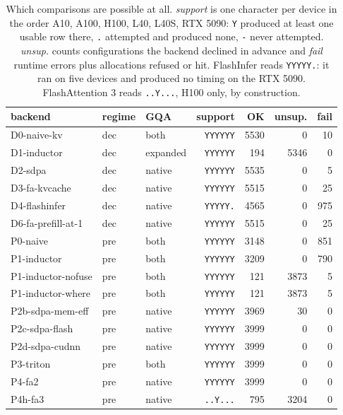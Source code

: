 \begin{table}[tb]
\centering
\small
\setlength{\tabcolsep}{6pt}
\begin{tabular}{lllrrrr}
\toprule
backend & regime & GQA & support & OK & unsup. & fail \\
\midrule
D0-naive-kv & dec & both & \texttt{YYYYYY} & 5530 & 0 & 10 \\
D1-inductor & dec & expanded & \texttt{YYYYYY} & 194 & 5346 & 0 \\
D2-sdpa & dec & native & \texttt{YYYYYY} & 5535 & 0 & 5 \\
D3-fa-kvcache & dec & native & \texttt{YYYYYY} & 5515 & 0 & 25 \\
D4-flashinfer & dec & native & \texttt{YYYYY.} & 4565 & 0 & 975 \\
D6-fa-prefill-at-1 & dec & native & \texttt{YYYYYY} & 5515 & 0 & 25 \\
P0-naive & pre & both & \texttt{YYYYYY} & 3148 & 0 & 851 \\
P1-inductor & pre & both & \texttt{YYYYYY} & 3209 & 0 & 790 \\
P1-inductor-nofuse & pre & both & \texttt{YYYYYY} & 121 & 3873 & 5 \\
P1-inductor-where & pre & both & \texttt{YYYYYY} & 121 & 3873 & 5 \\
P2b-sdpa-mem-eff & pre & native & \texttt{YYYYYY} & 3969 & 30 & 0 \\
P2c-sdpa-flash & pre & native & \texttt{YYYYYY} & 3999 & 0 & 0 \\
P2d-sdpa-cudnn & pre & native & \texttt{YYYYYY} & 3999 & 0 & 0 \\
P3-triton & pre & both & \texttt{YYYYYY} & 3999 & 0 & 0 \\
P4-fa2 & pre & native & \texttt{YYYYYY} & 3999 & 0 & 0 \\
P4h-fa3 & pre & native & \texttt{..Y...} & 795 & 3204 & 0 \\
\bottomrule
\end{tabular}
\caption{Which comparisons are possible at all. \emph{support} is one character
per device in the order A10, A100, H100, L40, L40S, RTX 5090: \texttt{Y} produced at least one
usable row there, \texttt{.} attempted and produced none, \texttt{-} never attempted.
\emph{unsup.} counts configurations the backend declined in advance and \emph{fail}
runtime errors plus allocations refused or hit. FlashInfer reads \texttt{YYYYY.}: it ran
on five devices and produced no timing on the RTX 5090. FlashAttention 3 reads
\texttt{..Y...}, H100 only, by construction.}
\label{tab:avail}
\end{table}
